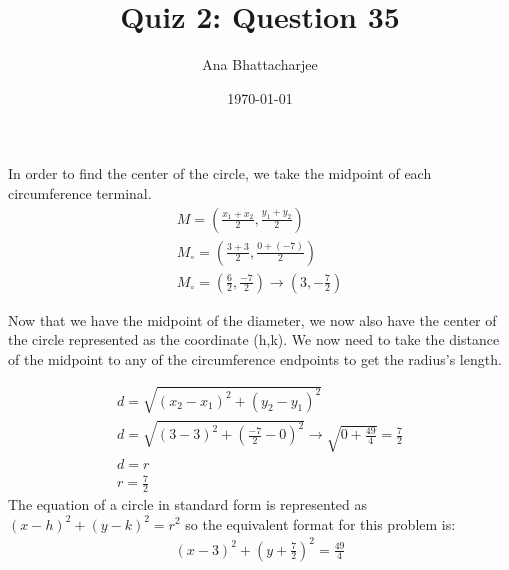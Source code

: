 \documentclass{article}
\begin{document}
\author{Ana Bhattacharjee}
\title{Quiz 2: Question 35}
\date{\today}
\maketitle{}

\begin{center}
In order to find the center of the circle, we take the midpoint of each circumference terminal.
\begin{align}
M = (\frac{x_1 + x_2}{2}, \frac{y_1 + y_2}{2}) \\
M_{\circ} = (\frac{3 + 3}{2}, \frac{0 + (-7)}{2}) \\
M_{\circ} = (\frac{6}{2}, \frac{-7}{2}) \rightarrow (3, -\frac{7}{2})
\end{align}

Now that we have the midpoint of the diameter, we now also have the center of the circle represented as the coordinate (h,k). We now need to take the distance of the midpoint to any of the circumference endpoints to get the radius's length.
\par
\begin{align}
  d = \sqrt{(x_2 - x_1)^2 + (y_2 - y_1)^2} \\
  d = \sqrt{(3 - 3)^2 + (\frac{-7}{2} - 0)^2} \rightarrow \sqrt{0 + \frac{49}{4}} = \frac{7}{2} \\
  d = r \\
  r = \frac{7}{2}
\end{align}
The equation of a circle in standard form is represented as $ (x - h)^2 + (y - k)^2 = r^2 $ so the equivalent format for this problem is:
\begin{align}
  (x - 3)^2 + (y + \frac{7}{2})^2 = \frac{49}{4} 
\end{align}
\end{center}
\end{document}
